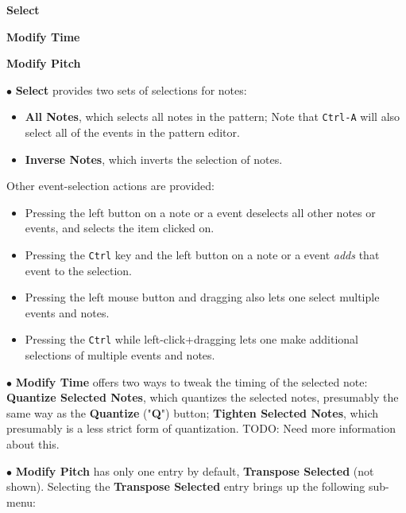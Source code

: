    \begin{enumber}
      \item \textbf{Select}
      \item \textbf{Modify Time}
      \item \textbf{Modify Pitch}
   \end{enumber}

   $\bullet$ \textbf{Select} provides two sets of selections for notes:
   \begin{itemize}
      \item \textbf{All Notes}, which selects all notes in the pattern;
         Note that  \texttt{Ctrl-A} will also select
         all of the events in the pattern editor.
      \item \textbf{Inverse Notes}, which inverts the selection of notes.
   \end{itemize}

   Other event-selection actions are provided:

   \begin{itemize}
      \item {}
         Pressing the left button on a note or a event deselects all other
         notes or events, and selects the item clicked on.
      \item {}
         Pressing the \texttt{Ctrl} key and the left button on a note or a
         event \textsl{adds} that event to the selection.
      \item {}
         Pressing the left mouse button and dragging also lets one
         select multiple events and notes.
      \item {}
         Pressing the \texttt{Ctrl} while left-click+dragging lets one
         make additional selections of multiple events and notes.
   \end{itemize}

   $\bullet$ \textbf{Modify Time} offers two ways to tweak the timing of the
   selected note:
   \textbf{Quantize Selected Notes}, which quantizes the selected
   notes, presumably the same way as the \textbf{Quantize} ("\textbf{Q}")
   button; \textbf{Tighten Selected Notes}, which presumably is a less
   strict form of quantization.
   TODO:  Need more information about this.

   $\bullet$ \textbf{Modify Pitch} has only one entry by default,
   \textbf{Transpose Selected} (not shown).
   Selecting the \textbf{Transpose Selected} entry
   brings up the following sub-menu:

